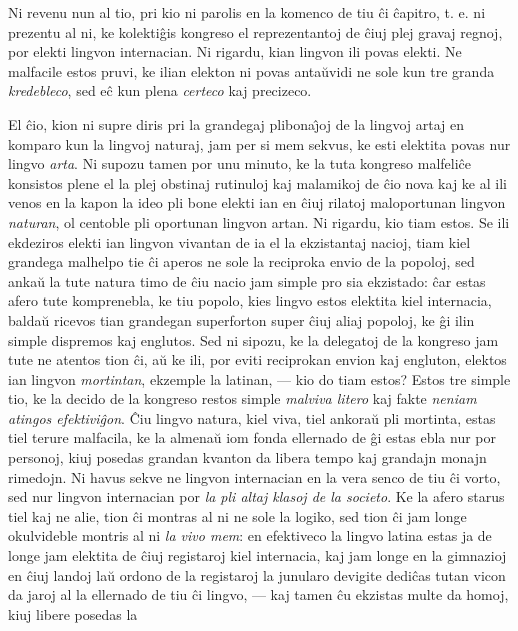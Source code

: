    Ni revenu nun al tio, pri kio ni parolis en la komenco de tiu
\^ci \^capitro, t. e. ni prezentu al ni, ke kolekti\^gis kongreso el
reprezentantoj de \^ciuj plej gravaj regnoj, por elekti lingvon
internacian. Ni rigardu, kian lingvon ili povas elekti. Ne malfacile
estos pruvi, ke ilian elekton ni povas anta\u uvidi ne sole kun tre
granda {\sl kredebleco}, sed e\^c kun plena {\sl certeco} kaj
precizeco.

   El \^cio, kion ni supre diris pri la grandegaj plibona\^{\j}oj de la
lingvoj artaj en komparo kun la lingvoj naturaj, jam per si mem
sekvus, ke esti elektita povas nur lingvo {\sl arta}. Ni supozu
tamen por unu minuto, ke la tuta kongreso malfeli\^ce konsistos
plene el la plej obstinaj rutinuloj kaj malamikoj de \^cio nova kaj
ke al ili venos en la kapon la ideo pli bone elekti ian en \^ciuj
rilatoj maloportunan lingvon {\sl naturan}, ol centoble pli
oportunan lingvon artan. Ni rigardu, kio tiam estos. Se ili
ekdeziros elekti ian lingvon vivantan de ia el la ekzistantaj
nacioj, tiam kiel grandega malhelpo tie \^ci aperos ne sole la
reciproka envio de la popoloj, sed anka\u u la tute natura timo de
\^ciu nacio jam simple pro sia ekzistado: \^car estas afero tute
komprenebla, ke tiu popolo, kies lingvo estos elektita kiel
internacia, balda\u u ricevos tian grandegan superforton super
\^ciuj aliaj popoloj, ke \^gi ilin simple dispremos kaj englutos.
Sed ni sipozu, ke la delegatoj de la kongreso jam tute ne atentos
tion \^ci, a\u u ke ili, por eviti reciprokan envion kaj engluton,
elektos ian lingvon {\sl mortintan}, ekzemple la latinan, --- kio do
tiam estos? Estos tre simple tio, ke la decido de la kongreso restos
simple {\sl malviva litero} kaj fakte {\sl neniam atingos
efektivi\^gon}. \^Ciu lingvo natura, kiel viva, tiel ankora\u u pli
mortinta, estas tiel terure malfacila, ke la almena\u u iom fonda
ellernado de \^gi estas ebla nur por personoj, kiuj posedas grandan
kvanton da libera tempo kaj grandajn monajn rimedojn. Ni havus sekve
ne lingvon internacian en la vera senco de tiu \^ci vorto, sed nur
lingvon internacian por {\sl la pli altaj klasoj de la societo}. Ke
la afero starus tiel kaj ne alie, tion \^ci montras al ni ne sole la
logiko, sed tion \^ci jam longe okulvideble montris al ni {\sl la
vivo mem}: en efektiveco la lingvo latina estas ja de longe jam
elektita de \^ciuj registaroj kiel internacia, kaj jam longe en la
gimnazioj en \^ciuj landoj la\u u ordono de la registaroj la
junularo devigite dedi\^cas tutan vicon da jaroj al la ellernado de
tiu \^ci lingvo,
--- kaj tamen \^cu ekzistas multe da homoj, kiuj libere posedas la
